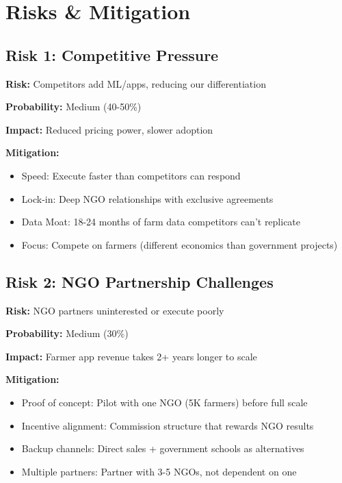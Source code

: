 
\chapter{Risks \& Mitigation}

\section{Risk 1: Competitive Pressure}

\textbf{Risk:} Competitors add ML/apps, reducing our differentiation

\textbf{Probability:} Medium (40-50\%)

\textbf{Impact:} Reduced pricing power, slower adoption

\textbf{Mitigation:}
\begin{itemize}
    \item Speed: Execute faster than competitors can respond
    \item Lock-in: Deep NGO relationships with exclusive agreements
    \item Data Moat: 18-24 months of farm data competitors can't replicate
    \item Focus: Compete on farmers (different economics than government projects)
\end{itemize}

\section{Risk 2: NGO Partnership Challenges}

\textbf{Risk:} NGO partners uninterested or execute poorly

\textbf{Probability:} Medium (30\%)

\textbf{Impact:} Farmer app revenue takes 2+ years longer to scale

\textbf{Mitigation:}
\begin{itemize}
    \item Proof of concept: Pilot with one NGO (5K farmers) before full scale
    \item Incentive alignment: Commission structure that rewards NGO results
    \item Backup channels: Direct sales + government schools as alternatives
    \item Multiple partners: Partner with 3-5 NGOs, not dependent on one
\end{itemize}

